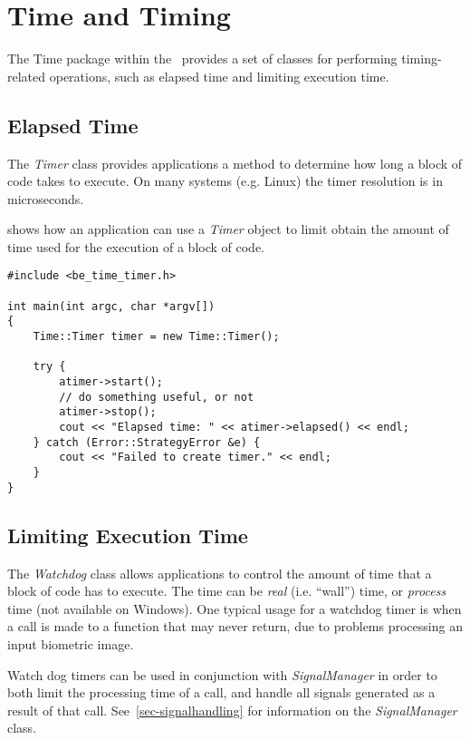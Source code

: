 %
%
\chapter{Time and Timing}
\label{chp-time}

The Time package within the \lname\ provides a set of classes for performing
timing-related operations, such as elapsed time and limiting execution time.

\section{Elapsed Time}

The {\em Timer} class provides applications a method to determine how long
a block of code takes to execute. On many systems (e.g. Linux) the timer
resolution is in microseconds.

 shows how an application can use a {\em Timer}
object to limit obtain the amount of time used for the execution of a block
of code.

\lstset{language=c++}
\begin{lstlisting}[caption={Using the Timer}, label=timeruse]
#include <be_time_timer.h>

int main(int argc, char *argv[])
{
	Time::Timer timer = new Time::Timer();

	try {
		atimer->start();
		// do something useful, or not
		atimer->stop();
		cout << "Elapsed time: " << atimer->elapsed() << endl;
	} catch (Error::StrategyError &e) {
		cout << "Failed to create timer." << endl;
	}
}
\end{lstlisting}

\section{Limiting Execution Time}

The {\em Watchdog} class allows applications to control the amount of time
that a block of code has to execute. The time can be {\em real} (i.e. ``wall'')
time, or {\em process} time (not available on Windows). One typical usage for
a watchdog timer is when a call is made to a function that may never return,
due to problems processing an input biometric image.

Watch dog timers can be used in conjunction with {\em SignalManager} in
order to both limit the processing time of a call, and handle all signals
generated as a result of that call. See~\ref{sec-signalhandling} for
information on the {\em SignalManager} class.


